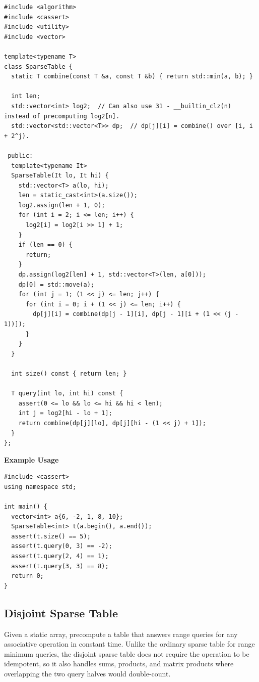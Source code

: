 \begin{lstlisting}[style=cpp]
#include <algorithm>
#include <cassert>
#include <utility>
#include <vector>

template<typename T>
class SparseTable {
  static T combine(const T &a, const T &b) { return std::min(a, b); }

  int len;
  std::vector<int> log2;  // Can also use 31 - __builtin_clz(n) instead of precomputing log2[n].
  std::vector<std::vector<T>> dp;  // dp[j][i] = combine() over [i, i + 2^j).

 public:
  template<typename It>
  SparseTable(It lo, It hi) {
    std::vector<T> a(lo, hi);
    len = static_cast<int>(a.size());
    log2.assign(len + 1, 0);
    for (int i = 2; i <= len; i++) {
      log2[i] = log2[i >> 1] + 1;
    }
    if (len == 0) {
      return;
    }
    dp.assign(log2[len] + 1, std::vector<T>(len, a[0]));
    dp[0] = std::move(a);
    for (int j = 1; (1 << j) <= len; j++) {
      for (int i = 0; i + (1 << j) <= len; i++) {
        dp[j][i] = combine(dp[j - 1][i], dp[j - 1][i + (1 << (j - 1))]);
      }
    }
  }

  int size() const { return len; }

  T query(int lo, int hi) const {
    assert(0 <= lo && lo <= hi && hi < len);
    int j = log2[hi - lo + 1];
    return combine(dp[j][lo], dp[j][hi - (1 << j) + 1]);
  }
};
\end{lstlisting}
\textbf{Example Usage}\par
\begin{lstlisting}[style=cpp]
#include <cassert>
using namespace std;

int main() {
  vector<int> a{6, -2, 1, 8, 10};
  SparseTable<int> t(a.begin(), a.end());
  assert(t.size() == 5);
  assert(t.query(0, 3) == -2);
  assert(t.query(2, 4) == 1);
  assert(t.query(3, 3) == 8);
  return 0;
}
\end{lstlisting}
\subsection{Disjoint Sparse Table}
\label{sec:2.5.2}
Given a static array, precompute a table that answers range queries for any associative operation in constant time. Unlike the ordinary sparse table for range minimum queries, the disjoint sparse table does not require the operation to be idempotent, so it also handles sums, products, and matrix products where overlapping the two query halves would double-count.

